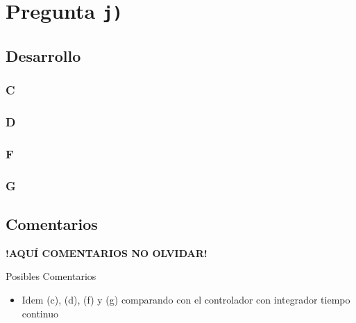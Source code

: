 \section{Pregunta \texttt{j)}}\label{pregunta-j}
\subsection{Desarrollo}

\subsubsection{C} %

\FloatBarrier
\subsubsection{D}%


\FloatBarrier
\subsubsection{F}%

\FloatBarrier
\subsubsection{G}%



\FloatBarrier
\subsection{Comentarios}


\textbf{!AQUÍ COMENTARIOS NO OLVIDAR!}

Posibles Comentarios
\begin{itemize}
    \item Idem (c), (d), (f) y (g) comparando con el controlador con integrador tiempo continuo
\end{itemize}